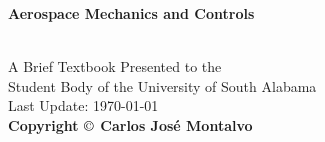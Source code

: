 \documentclass{article}
\begin{document}
\begin{center}
\begin{LARGE}{\bf Aerospace Mechanics and Controls}\end{LARGE}\\
\large
\vspace{22 mm}
   A Brief Textbook Presented to the \\ 
   Student Body of the University of South Alabama \\
\vspace{22 mm}
\vspace{22 mm}
\vspace{22 mm}
Last Update: \today\\
{\bf Copyright $\copyright$ Carlos Jos\'{e} Montalvo}
\end{center}



\linespread{1}

\newpage


\end{document}
